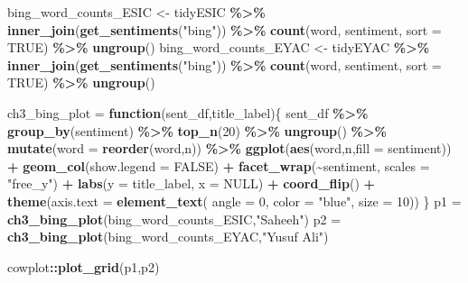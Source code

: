 \documentclass[
]{article}
\newenvironment{Shaded}{\begin{snugshade}}{\end{snugshade}}
\newcommand{\AttributeTok}[1]{\textcolor[rgb]{0.13,0.29,0.53}{#1}}
\newcommand{\ConstantTok}[1]{\textcolor[rgb]{0.56,0.35,0.01}{#1}}
\newcommand{\ControlFlowTok}[1]{\textcolor[rgb]{0.13,0.29,0.53}{\textbf{#1}}}
\newcommand{\DecValTok}[1]{\textcolor[rgb]{0.00,0.00,0.81}{#1}}
\newcommand{\FunctionTok}[1]{\textcolor[rgb]{0.13,0.29,0.53}{\textbf{#1}}}
\newcommand{\NormalTok}[1]{#1}
\newcommand{\OtherTok}[1]{\textcolor[rgb]{0.56,0.35,0.01}{#1}}
\newcommand{\SpecialCharTok}[1]{\textcolor[rgb]{0.81,0.36,0.00}{\textbf{#1}}}
\newcommand{\StringTok}[1]{\textcolor[rgb]{0.31,0.60,0.02}{#1}}
\begin{document}
\begin{Shaded}
\begin{Highlighting}[]
\NormalTok{bing\_word\_counts\_ESIC }\OtherTok{\textless{}{-}}\NormalTok{ tidyESIC }\SpecialCharTok{\%\textgreater{}\%}
  \FunctionTok{inner\_join}\NormalTok{(}\FunctionTok{get\_sentiments}\NormalTok{(}\StringTok{"bing"}\NormalTok{)) }\SpecialCharTok{\%\textgreater{}\%}
  \FunctionTok{count}\NormalTok{(word, sentiment, }\AttributeTok{sort =} \ConstantTok{TRUE}\NormalTok{) }\SpecialCharTok{\%\textgreater{}\%}
  \FunctionTok{ungroup}\NormalTok{()}
\NormalTok{bing\_word\_counts\_EYAC }\OtherTok{\textless{}{-}}\NormalTok{ tidyEYAC }\SpecialCharTok{\%\textgreater{}\%}
  \FunctionTok{inner\_join}\NormalTok{(}\FunctionTok{get\_sentiments}\NormalTok{(}\StringTok{"bing"}\NormalTok{)) }\SpecialCharTok{\%\textgreater{}\%}
  \FunctionTok{count}\NormalTok{(word, sentiment, }\AttributeTok{sort =} \ConstantTok{TRUE}\NormalTok{) }\SpecialCharTok{\%\textgreater{}\%}
  \FunctionTok{ungroup}\NormalTok{()}

\NormalTok{ch3\_bing\_plot }\OtherTok{=} \ControlFlowTok{function}\NormalTok{(sent\_df,title\_label)\{}
\NormalTok{  sent\_df }\SpecialCharTok{\%\textgreater{}\%} 
    \FunctionTok{group\_by}\NormalTok{(sentiment) }\SpecialCharTok{\%\textgreater{}\%} 
    \FunctionTok{top\_n}\NormalTok{(}\DecValTok{20}\NormalTok{) }\SpecialCharTok{\%\textgreater{}\%} \FunctionTok{ungroup}\NormalTok{() }\SpecialCharTok{\%\textgreater{}\%} 
    \FunctionTok{mutate}\NormalTok{(}\AttributeTok{word =} \FunctionTok{reorder}\NormalTok{(word,n)) }\SpecialCharTok{\%\textgreater{}\%} 
    \FunctionTok{ggplot}\NormalTok{(}\FunctionTok{aes}\NormalTok{(word,n,}\AttributeTok{fill =}\NormalTok{ sentiment)) }\SpecialCharTok{+}
      \FunctionTok{geom\_col}\NormalTok{(}\AttributeTok{show.legend =} \ConstantTok{FALSE}\NormalTok{) }\SpecialCharTok{+}
      \FunctionTok{facet\_wrap}\NormalTok{(}\SpecialCharTok{\textasciitilde{}}\NormalTok{sentiment, }\AttributeTok{scales =} \StringTok{"free\_y"}\NormalTok{) }\SpecialCharTok{+}
      \FunctionTok{labs}\NormalTok{(}\AttributeTok{y =}\NormalTok{ title\_label, }\AttributeTok{x =} \ConstantTok{NULL}\NormalTok{) }\SpecialCharTok{+}
      \FunctionTok{coord\_flip}\NormalTok{() }\SpecialCharTok{+}
      \FunctionTok{theme}\NormalTok{(}\AttributeTok{axis.text =} \FunctionTok{element\_text}\NormalTok{(}
                        \AttributeTok{angle =} \DecValTok{0}\NormalTok{,}
                        \AttributeTok{color =} \StringTok{"blue"}\NormalTok{,}
                        \AttributeTok{size =} \DecValTok{10}\NormalTok{))}
\NormalTok{\}}
\NormalTok{p1 }\OtherTok{=} \FunctionTok{ch3\_bing\_plot}\NormalTok{(bing\_word\_counts\_ESIC,}\StringTok{"Saheeh"}\NormalTok{)}
\NormalTok{p2 }\OtherTok{=} \FunctionTok{ch3\_bing\_plot}\NormalTok{(bing\_word\_counts\_EYAC,}\StringTok{"Yusuf Ali"}\NormalTok{)}

\NormalTok{cowplot}\SpecialCharTok{::}\FunctionTok{plot\_grid}\NormalTok{(p1,p2)}
\end{Highlighting}
\end{Shaded}
\end{document}
